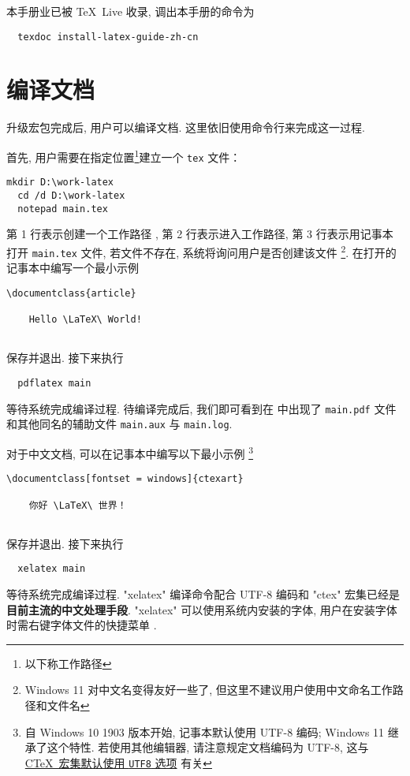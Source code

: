 本手册业已被 \TeX~Live 收录,
调出本手册的命令为
\begin{lstlisting}
  texdoc install-latex-guide-zh-cn
\end{lstlisting}

\section{编译文档}\label{sec:windows:compile}

升级宏包完成后, 用户可以编译文档. 
这里依旧使用命令行来完成这一过程. 

首先, 用户需要在指定位置\footnote{以下称工作路径}建立一个 \texttt{tex} 文件：
\begin{lstlisting}[deletekeywords = tex]
  mkdir D:\work-latex
  cd /d D:\work-latex
  notepad main.tex
\end{lstlisting}
第 1 行表示创建一个工作路径 ,
第 2 行表示进入工作路径, 第 3 行表示用记事本打开 \texttt{main.tex} 文件,
若文件不存在, 系统将询问用户是否创建该文件%
\footnote{Windows 11 对中文名变得友好一些了,
但这里不建议用户使用中文命名工作路径和文件名}.
在打开的记事本中编写一个最小示例
\begin{lstlisting}[language = mwe]
  \documentclass{article}
  
    Hello \LaTeX\ World!
  
\end{lstlisting}
保存并退出. 
接下来执行
\begin{lstlisting}
  pdflatex main
\end{lstlisting}
等待系统完成编译过程. 
待编译完成后, 我们即可看到在 
中出现了 \texttt{main.pdf} 文件和其他同名的辅助文件
\texttt{main.aux} 与 \texttt{main.log}. 

对于中文文档, 可以在记事本中编写以下最小示例%
\footnote{自 Windows 10 1903 版本开始, 记事本默认使用 UTF-8 编码;
Windows 11 继承了这个特性.
若使用其他编辑器,
请注意规定文档编码为 UTF-8,
这与
\href{http://mirrors.ctan.org/language/chinese/ctex/ctex.pdf#page6}{C\TeX\ 宏集默认使用 \texttt{UTF8} 选项}%
有关}%
\begin{lstlisting}[language = mwe]
  \documentclass[fontset = windows]{ctexart}
  
    你好 \LaTeX\ 世界！
  
\end{lstlisting}
保存并退出.
接下来执行
\begin{lstlisting}
  xelatex main
\end{lstlisting}
等待系统完成编译过程.
"xelatex" 编译命令配合 UTF-8 编码和 "ctex"
宏集已经是\textbf{目前主流的中文处理手段}.
"xelatex" 可以使用系统内安装的字体,
用户在安装字体时需右键字体文件的快捷菜单 .

